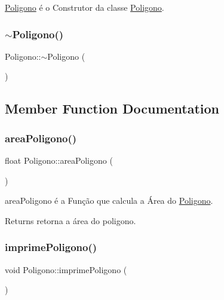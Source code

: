 \mbox{\hyperlink{class_poligono}{Poligono}} é o Construtor da classe \mbox{\hyperlink{class_poligono}{Poligono}}. 

\mbox{\label{class_poligono_a4dd7136ee506cb4355cbdc724c55a4a0}} 
\subsubsection{\texorpdfstring{$\sim$\+Poligono()}{~Poligono()}}
{\footnotesize\ttfamily Poligono\+::$\sim$\+Poligono (\begin{DoxyParamCaption}{ }\end{DoxyParamCaption})}



\subsection{Member Function Documentation}
\mbox{\label{class_poligono_ac1e37e274f61dff6c421f972ef1cf891}} 
\subsubsection{\texorpdfstring{area\+Poligono()}{areaPoligono()}}
{\footnotesize\ttfamily float Poligono\+::area\+Poligono (\begin{DoxyParamCaption}{ }\end{DoxyParamCaption})}



area\+Poligono é a Função que calcula a Área do \mbox{\hyperlink{class_poligono}{Poligono}}. 

\begin{DoxyReturn}{Returns}
retorna a área do poligono. 
\end{DoxyReturn}
\mbox{\label{class_poligono_a87d58f9d4827793eaa811491cce097b0}} 
\subsubsection{\texorpdfstring{imprime\+Poligono()}{imprimePoligono()}}
{\footnotesize\ttfamily void Poligono\+::imprime\+Poligono (\begin{DoxyParamCaption}{ }\end{DoxyParamCaption})}



